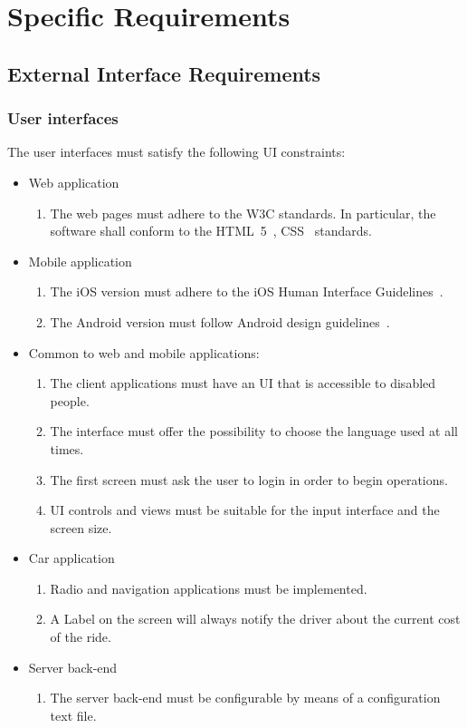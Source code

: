 \section{Specific Requirements}\label{sec requirements}

\subsection{External Interface Requirements}

\subsubsection{User interfaces}

The user interfaces must satisfy the following UI constraints:
\begin{itemize}
	\item Web application
	\begin{enumerate}
		\item The web pages must adhere to the W3C standards. In particular, the software shall conform to the HTML~5~\cite{w3c-html5}, CSS~\cite{w3c-css} standards.
	\end{enumerate}
	\item Mobile application
	\begin{enumerate}
		\item The iOS version must adhere to the iOS Human Interface Guidelines~\cite{apple-ios-hig}.
		\item The Android version must follow Android design guidelines~\cite{google-android-hig}.
	\end{enumerate}
		\item Common to web and mobile applications:
		\begin{enumerate}
			\item The client applications must have an UI that is accessible to disabled people.
			\item The interface must offer the possibility to choose the language used at all times.
			\item The first screen must ask the user to login in order to begin operations.
			\item UI controls and views must be suitable for the input interface and the screen size.
		\end{enumerate}
	\item Car application
	\begin{enumerate}
		\item Radio and navigation applications must be implemented.
		\item A Label on the screen will always notify the driver about the current cost of the ride.
	\end{enumerate}
	\item Server back-end
	\begin{enumerate}
		\item The server back-end must be configurable by means of a configuration text file.
	\end{enumerate}
	

\end{itemize}
